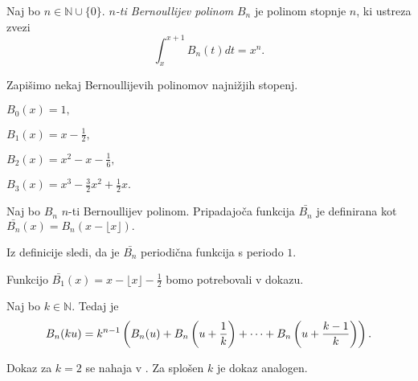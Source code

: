 \documentclass[mat1]{fmfdelo}
\begin{document}
\begin{definicija}
Naj bo $n \in \mathbb{N} \cup \{0\}.$ \emph{$n$-ti Bernoullijev polinom} $B_{n}$ je polinom stopnje $n$, ki ustreza zvezi
\begin{equation}
\int_{x}^{x+1} B_{n}(t) dt = x^{n}.
\end{equation}
\end{definicija}

\begin{primer}
Zapišimo nekaj Bernoullijevih polinomov najnižjih stopenj.

\( B_{0}(x) = 1, \)

\( B_{1}(x) = x - \frac{1}{2}, \)

\( B_{2}(x) = x^2 - x - \frac{1}{6}, \)

\( B_{3}(x) = x^3 - \frac{3}{2} x^2 + \frac{1}{2} x. \)
\end{primer}

\begin{definicija}
Naj bo $B_{n}$ $n$-ti Bernoullijev polinom. Pripadajoča funkcija $ \bar{B_{n}} $ je definirana kot $ \bar{B_{n}}(x) = B_{n}(x - \lfloor x \rfloor). $
\end{definicija}

\begin{opomba}
Iz definicije sledi, da je $ \bar{B_{n}} $ periodična funkcija s periodo $1$.
\end{opomba}

\begin{primer}
Funkcijo $ \bar{B_{1}}(x) = x - \lfloor x \rfloor - \frac{1}{2} $ bomo potrebovali v dokazu.
\end{primer}

\begin{trditev}
Naj bo $k \in \mathbb{N}$. Tedaj je
\begin{equation}
\label{Eq:B_{n}(ku)}
B_{n}(ku) = k^{n-1} \left ( B_{n}(u) + B_{n} \left( u + \frac{1}{k} \right) + \cdots + B_{n} \left( u + \frac{k-1}{k} \right) \right).
\end{equation}
\end{trditev}

\begin{dokaz}
Dokaz za $k=2$ se nahaja v \cite[poglavje 6.2, str.~102 -- 103]{zetafunction}. Za splošen $k$ je dokaz analogen.
\end{dokaz}

\end{document}
